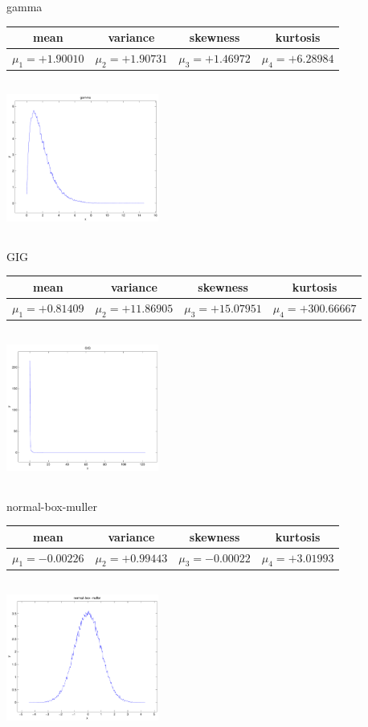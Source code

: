 \documentclass[9pt]{article}
\theoremstyle{plain}
\theoremstyle{definition}
\theoremstyle{remark}
\numberwithin{equation}{section}
\begin{document}
\newpage
gamma \begin{tabular}{|c|c|c|c|}  mean & variance & skewness & kurtosis \\  \hline
$\mu_1 = +1.90010$ & $\mu_2 = +1.90731$ & $\mu_3 = +1.46972$ & $\mu_4 =+6.28984$ \\
\end{tabular}

\includegraphics[width=5cm,height=5cm]{gamma.pdf}

GIG \begin{tabular}{|c|c|c|c|}  mean & variance & skewness & kurtosis \\  \hline
$\mu_1 = +0.81409$ & $\mu_2 = +11.86905$ & $\mu_3 = +15.07951$ & $\mu_4 =+300.66667$ \\
\end{tabular}

\includegraphics[width=5cm,height=5cm]{GIG.pdf}

normal-box-muller \begin{tabular}{|c|c|c|c|}  mean & variance & skewness & kurtosis \\  \hline
$\mu_1 = -0.00226$ & $\mu_2 = +0.99443$ & $\mu_3 = -0.00022$ & $\mu_4 =+3.01993$ \\
\end{tabular}

\includegraphics[width=5cm,height=5cm]{normal-box-muller.pdf}
\end{document}
